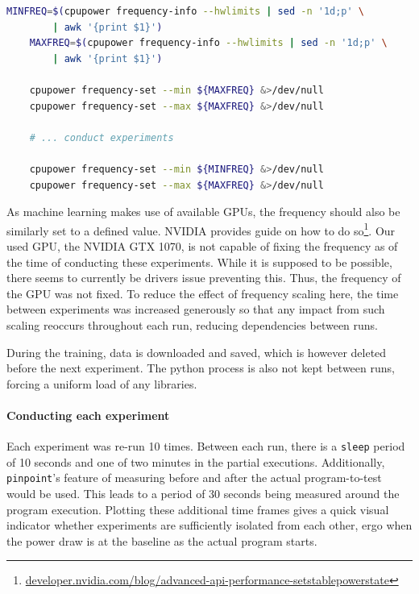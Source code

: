 \begin{minipage}{\linewidth}
\begin{lstlisting}[language=bash, frame=single, numbers=none, caption={Used operating system information}, basicstyle=\ttfamily]
    MINFREQ=$(cpupower frequency-info --hwlimits | sed -n '1d;p' \
        | awk '{print $1}')
    MAXFREQ=$(cpupower frequency-info --hwlimits | sed -n '1d;p' \
        | awk '{print $1}')
    
    cpupower frequency-set --min ${MAXFREQ} &>/dev/null
    cpupower frequency-set --max ${MAXFREQ} &>/dev/null

    # ... conduct experiments

    cpupower frequency-set --min ${MINFREQ} &>/dev/null
    cpupower frequency-set --max ${MAXFREQ} &>/dev/null
\end{lstlisting}
\label{listing:setting_cpu_frequency}
\end{minipage}

As machine learning makes use of available GPUs, the frequency should also be similarly set to a defined value. 
NVIDIA provides guide on how to do so\footnote{\url{developer.nvidia.com/blog/advanced-api-performance-setstablepowerstate}}.
Our used GPU, the NVIDIA GTX 1070, is not capable of fixing the frequency as of the time of conducting these experiments. 
While it is supposed to be possible, there seems to currently be drivers issue preventing this\webcite{web_powerlimitissue}.
Thus, the frequency of the GPU was not fixed. 
To reduce the effect of frequency scaling here, the time between experiments was increased generously so that any impact from such scaling reoccurs throughout each run, reducing dependencies between runs.

During the training, data is downloaded and saved, which is however deleted before the next experiment. 
The python process is also not kept between runs, forcing a uniform load of any libraries.

\paragraph{Conducting each experiment}

Each experiment was re-run 10 times. Between each run, there is a \verb|sleep| period of 10 seconds and one of two minutes in the partial executions. 
Additionally, \verb|pinpoint|'s feature of measuring before and after the actual program-to-test would be used. 
This leads to a period of 30 seconds being measured around the program execution. 
Plotting these additional time frames gives a quick visual indicator whether experiments are sufficiently isolated from each other, ergo when the power draw is at the baseline as the actual program starts.

